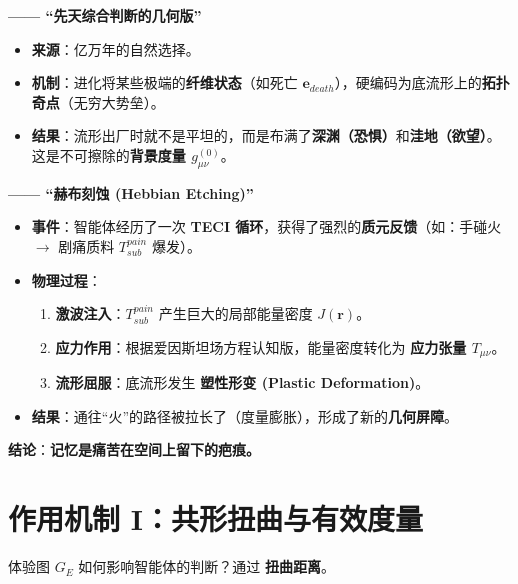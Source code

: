 
\textbf{—— “先天综合判断的几何版”}
\begin{itemize}
    \item   \textbf{来源}：亿万年的自然选择。
    \item   \textbf{机制}：进化将某些极端的\textbf{纤维状态}（如死亡 $\mathbf{e}_{death}$），硬编码为底流形上的\textbf{拓扑奇点}（无穷大势垒）。
    \item   \textbf{结果}：流形出厂时就不是平坦的，而是布满了\textbf{深渊（恐惧）}和\textbf{洼地（欲望）}。这是不可擦除的\textbf{背景度量 $g^{(0)}_{\mu\nu}$}。
\end{itemize}




\textbf{—— “赫布刻蚀 (Hebbian Etching)”}
\begin{itemize}
    \item   \textbf{事件}：智能体经历了一次 \textbf{TECI 循环}，获得了强烈的\textbf{质元反馈}（如：手碰火 $\to$ 剧痛质料 $T_{sub}^{pain}$ 爆发）。
    \item   \textbf{物理过程}：
    \begin{enumerate}
        \item  \textbf{激波注入}：$T_{sub}^{pain}$ 产生巨大的局部能量密度 $J(\mathbf{r})$。
        \item  \textbf{应力作用}：根据爱因斯坦场方程认知版，能量密度转化为 \textbf{应力张量 $T_{\mu\nu}$}。
        \item  \textbf{流形屈服}：底流形发生 \textbf{塑性形变 (Plastic Deformation)}。
    \end{enumerate}
    \item   \textbf{结果}：通往“火”的路径被拉长了（度量膨胀），形成了新的\textbf{几何屏障}。
\end{itemize}
\textbf{结论}：\textbf{记忆是痛苦在空间上留下的疤痕。}


\section{作用机制 I：共形扭曲与有效度量}
\label{sec:section_8091}

体验图 $G_E$ 如何影响智能体的判断？通过 \textbf{扭曲距离}。

